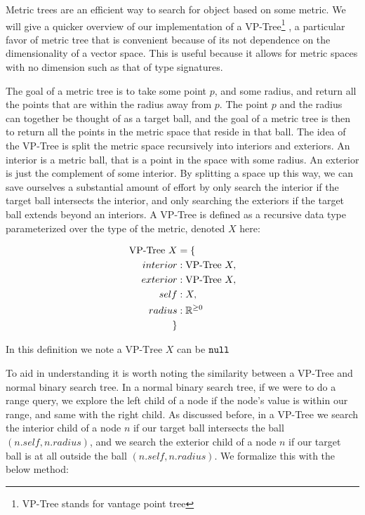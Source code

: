 Metric trees are an efficient way to search for object based on some metric.
We will give a quicker overview of our implementation of a VP-Tree\footnote{VP-Tree stands for vantage point tree} \cite{j2kun_2014},
a particular favor of metric tree that is convenient because of its not dependence on the dimensionality of a vector space.
This is useful because it allows for metric spaces with no dimension such as that of type signatures.

The goal of a metric tree is to take some point $p$, and some radius, and return all the points that are within the radius away from $p$.
The point $p$ and the radius can together be thought of as a target ball, and the goal of a metric tree is then to return all the points in the metric space 
    that reside in that ball.
The idea of the VP-Tree is split the metric space recursively into interiors and exteriors.
An interior is a metric ball, that is a point in the space with some radius.
An exterior is just the complement of some interior.
By splitting a space up this way, 
we can save ourselves a substantial amount of effort by only search the interior if the target ball intersects the interior,
and only searching the exteriors if the target ball extends beyond an interiors.
A VP-Tree is defined as a recursive data type parameterized over the type of the metric, denoted $X$ here:

\begin{align*}
\text{VP-Tree } X &= \{ \\ 
interior &: \text{VP-Tree } X, \\ 
exterior &: \text{VP-Tree } X, \\ 
self &: X, \\ 
radius &: \mathbb{R}^{\ge 0} \\
\}
\end{align*}

In this definition we note a $\text{VP-Tree } X$ can be $\texttt{null}$

To aid in understanding it is worth noting the similarity between a VP-Tree and normal binary search tree.
In a normal binary search tree,
if we were to do a range query,
we explore the left child of a node if the node's value is within our range,
and same with the right child.
As discussed before,
in a VP-Tree we search the interior child of a node $n$ if our target ball intersects the ball $(n.self, n.radius)$,
and we search the exterior child of a node $n$ if our target ball is at all outside the ball $(n.self, n.radius)$.
We formalize this with the below method:

